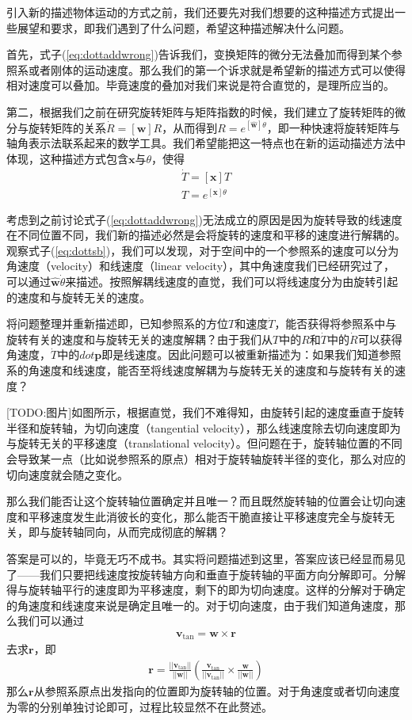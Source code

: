 \documentclass[12pt, a4paper, article, UTF8]{ctexart}
\begin{document}
引入新的描述物体运动的方式之前，我们还要先对我们想要的这种描述方式提出一些展望和要求，即我们遇到了什么问题，希望这种描述解决什么问题。

首先，式子(\ref{eq:dottaddwrong})告诉我们，变换矩阵的微分无法叠加而得到某个参照系或者刚体的运动速度。那么我们的第一个诉求就是希望新的描述方式可以使得相对速度可以叠加。毕竟速度的叠加对我们来说是符合直觉的，是理所应当的。

第二，根据我们之前在研究旋转矩阵与矩阵指数的时候，我们建立了旋转矩阵的微分与旋转矩阵的关系$\dot{R}=[\mathbf{w}]R$，从而得到$R=e^{[\hat{\mathbf{w}}]\theta}$，即一种快速将旋转矩阵与轴角表示法联系起来的数学工具。我们希望能把这一特点也在新的运动描述方法中体现，这种描述方式包含$\mathbf{x}$与$\theta$，使得
\begin{align}
\dot{T} = [\mathbf{x}]T\\
T = e^{[\mathbf{x}]\theta}
\end{align}

考虑到之前讨论式子(\ref{eq:dottaddwrong})无法成立的原因是因为旋转导致的线速度在不同位置不同，我们新的描述必然是会将旋转的速度和平移的速度进行解耦的。观察式子(\ref{eq:dottsb})，我们可以发现，对于空间中的一个参照系的速度可以分为角速度（velocity）和线速度（linear velocity），其中角速度我们已经研究过了，可以通过$\hat{\mathbf{w}}\dot{\theta}$来描述。按照解耦线速度的直觉，我们可以将线速度分为由旋转引起的速度和与旋转无关的速度。

将问题整理并重新描述即，已知参照系的方位$T$和速度$\dot{T}$，能否获得将参照系中与旋转有关的速度和与旋转无关的速度解耦？由于我们从$T$中的$R$和$\dot{T}$中的$\dot{R}$可以获得角速度，$\dot{T}$中的$dot{\mathbf{p}}$即是线速度。因此问题可以被重新描述为：如果我们知道参照系的角速度和线速度，能否至将线速度解耦为与旋转无关的速度和与旋转有关的速度？

[TODO:图片]如图所示，根据直觉，我们不难得知，由旋转引起的速度垂直于旋转半径和旋转轴，为切向速度（tangential velocity），那么线速度除去切向速度即为与旋转无关的平移速度（translational velocity）。但问题在于，旋转轴位置的不同会导致某一点（比如说参照系的原点）相对于旋转轴旋转半径的变化，那么对应的切向速度就会随之变化。

那么我们能否让这个旋转轴位置确定并且唯一？而且既然旋转轴的位置会让切向速度和平移速度发生此消彼长的变化，那么能否干脆直接让平移速度完全与旋转无关，即与旋转轴同向，从而完成彻底的解耦？

答案是可以的，毕竟无巧不成书。其实将问题描述到这里，答案应该已经显而易见了——我们只要把线速度按旋转轴方向和垂直于旋转轴的平面方向分解即可。分解得与旋转轴平行的速度即为平移速度，剩下的即为切向速度。这样的分解对于确定的角速度和线速度来说是确定且唯一的。对于切向速度，由于我们知道角速度，那么我们可以通过
\begin{align}
\mathbf{v}_\text{tan} = \mathbf{w} \times \mathbf{r} \label{eq:tangentialvelocity}
\end{align}
去求$\mathbf{r}$，即
\begin{align}
\mathbf{r} = \frac{||\mathbf{v}_\text{tan}||}{||\mathbf{w}||} (\frac{\mathbf{v}_\text{tan}}{||\mathbf{v}_\text{tan}||} \times \frac{\mathbf{w}}{||\mathbf{w}||})
\end{align}
那么$\mathbf{r}$从参照系原点出发指向的位置即为旋转轴的位置。对于角速度或者切向速度为零的分别单独讨论即可，过程比较显然不在此赘述。
\end{document}
